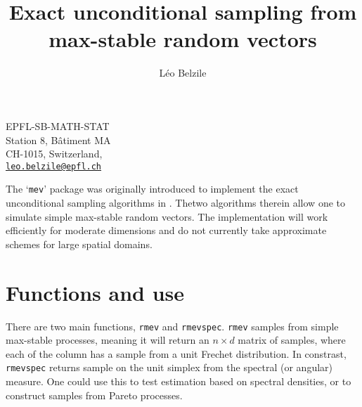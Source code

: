 \documentclass{article}\usepackage[]{graphicx}\usepackage[]{color}
\newcommand{\code}[1]{\texttt{#1}}
\begin{document}

\title{Exact unconditional sampling from max-stable random vectors}
\author{Léo Belzile}
\date{}
\maketitle
\begin{center}
{ \small
EPFL-SB-MATH-STAT \\ Station 8, Bâtiment MA \\CH-1015, Switzerland,\\ \href{leo.belzile@epfl.ch}{\texttt{leo.belzile@epfl.ch}}
}
\end{center}

The `\code{mev}' package was originally introduced to implement the exact unconditional sampling algorithms in \cite{Dombry:2016}. Thetwo algorithms therein allow one to simulate simple max-stable random vectors. The implementation will work efficiently for moderate dimensions and do not currently take approximate schemes for large spatial domains.

\section{Functions and use}

There are two main functions, \code{rmev} and \code{rmevspec}. \code{rmev} samples from simple max-stable processes, meaning it will return an $n \times d$ matrix of samples, where each of the column has a sample from a unit Frechet distribution. In constrast, \code{rmevspec} returns sample on the unit simplex from the spectral (or angular) measure. One could use this to test estimation based on spectral densities, or to construct samples from Pareto processes.
\end{document}
